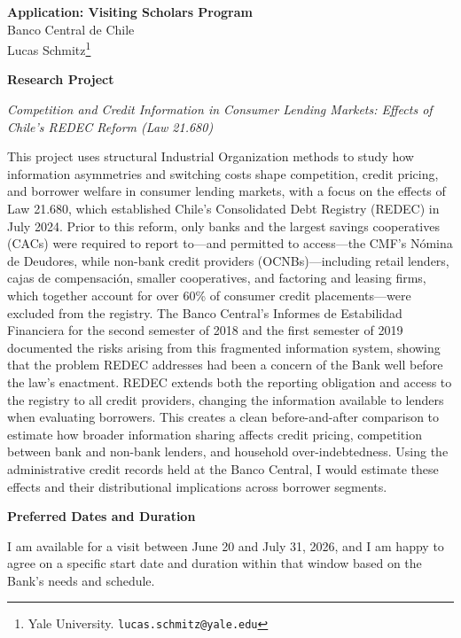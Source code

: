 \documentclass[12pt]{article}
\begin{document}
\begin{center}
    {\large \textbf{Application: Visiting Scholars Program}}\\[0.4em]
    {\large Banco Central de Chile}\\[0.8em]
    {\normalsize Lucas Schmitz\footnote{Yale University. \texttt{lucas.schmitz@yale.edu}}}
\end{center}

\bigskip

\noindent\textbf{Research Project}

\medskip

\noindent\textit{Competition and Credit Information in Consumer Lending Markets: Effects of Chile's REDEC Reform (Law 21.680)}

\medskip

This project uses structural Industrial Organization methods to study how information asymmetries and switching costs shape competition, credit pricing, and borrower welfare in consumer lending markets, with a focus on the effects of Law 21.680, which established Chile's Consolidated Debt Registry (REDEC) in July 2024. Prior to this reform, only banks and the largest savings cooperatives (CACs) were required to report to---and permitted to access---the CMF's N\'{o}mina de Deudores, while non-bank credit providers (OCNBs)---including retail lenders, cajas de compensaci\'{o}n, smaller cooperatives, and factoring and leasing firms, which together account for over 60\% of consumer credit placements---were excluded from the registry. The Banco Central's Informes de Estabilidad Financiera for the second semester of 2018 and the first semester of 2019 documented the risks arising from this fragmented information system, showing that the problem REDEC addresses had been a concern of the Bank well before the law's enactment. REDEC extends both the reporting obligation and access to the registry to all credit providers, changing the information available to lenders when evaluating borrowers. This creates a clean before-and-after comparison to estimate how broader information sharing affects credit pricing, competition between bank and non-bank lenders, and household over-indebtedness. Using the administrative credit records held at the Banco Central, I would estimate these effects and their distributional implications across borrower segments.

\bigskip

\noindent\textbf{Preferred Dates and Duration}

\medskip

\noindent I am available for a visit between June 20 and July 31, 2026, and I am happy to agree on a specific start date and duration within that window based on the Bank's needs and schedule.
\end{document}
